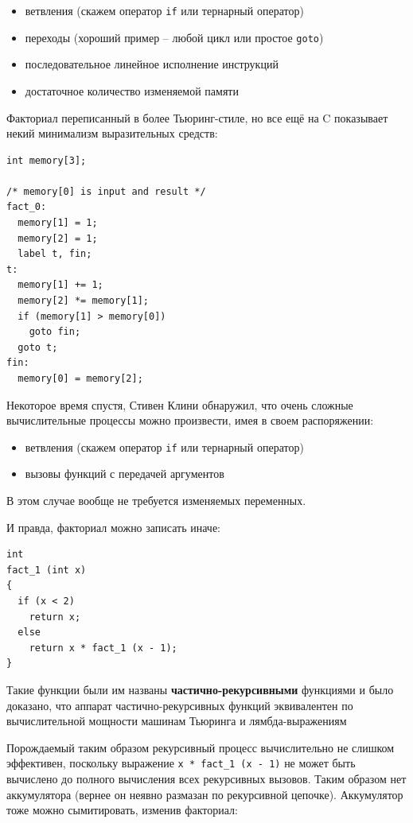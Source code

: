 \documentclass[a4paper,12pt,oneside]{article}
\begin{document}
\begin{itemize}
\item ветвления (скажем оператор \lstinline!if! или тернарный оператор)
\item переходы (хороший пример -- любой цикл или простое \lstinline!goto!)
\item последовательное линейное исполнение инструкций
\item достаточное количество изменяемой памяти
\end{itemize}

Факториал переписанный в более Тьюринг-стиле, но все ещё на C показывает некий минимализм выразительных средств:

\begin{lstlisting}
int memory[3];

/* memory[0] is input and result */
fact_0:
  memory[1] = 1;
  memory[2] = 1;
  label t, fin;
t:
  memory[1] += 1;
  memory[2] *= memory[1];
  if (memory[1] > memory[0]) 
    goto fin;
  goto t;
fin:
  memory[0] = memory[2];
\end{lstlisting}

Некоторое время спустя, Стивен Клини обнаружил, что очень сложные вычислительные процессы можно произвести, имея в своем распоряжении:

\begin{itemize}
\item ветвления (скажем оператор \lstinline!if! или тернарный оператор)
\item вызовы функций с передачей аргументов
\end{itemize}

В этом случае вообще не требуется изменяемых переменных.

И правда, факториал можно записать иначе:

\begin{lstlisting}
int
fact_1 (int x)
{
  if (x < 2)
    return x;
  else
    return x * fact_1 (x - 1);
}
\end{lstlisting}

Такие функции были им названы \textbf{частично-рекурсивными} функциями и было доказано, что аппарат частично-рекурсивных функций эквивалентен по вычислительной мощности машинам Тьюринга и лямбда-выражениям

Порождаемый таким образом рекурсивный процесс вычислительно не слишком эффективен, поскольку выражение \lstinline!x * fact_1 (x - 1)! не может быть вычислено до полного вычисления всех рекурсивных вызовов. Таким образом нет аккумулятора (вернее он неявно размазан по рекурсивной цепочке). Аккумулятор тоже можно сымитировать, изменив факториал:
\end{document}
